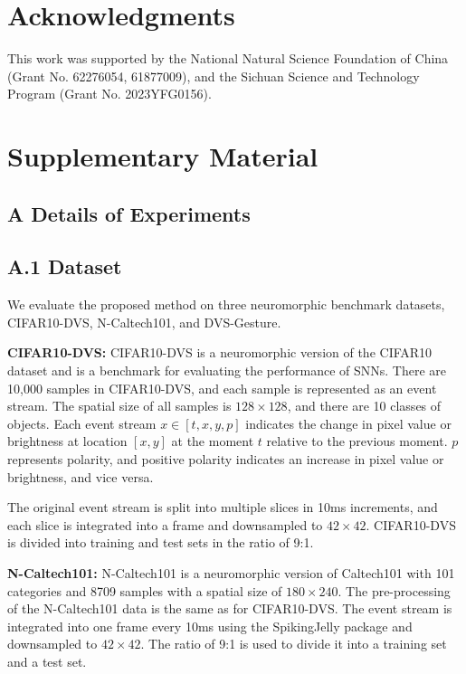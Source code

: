 \documentclass[letterpaper]{article} %
\begin{document}
\section{Acknowledgments}
This work was supported by the National Natural Science Foundation of China (Grant No. 62276054, 61877009), and the Sichuan Science and Technology Program (Grant No. 2023YFG0156).

\appendix
\section{Supplementary Material}
\label{Supplementary Material}
\subsection{A Details of Experiments}
\subsection{A.1 Dataset}
We evaluate the proposed method on three neuromorphic benchmark datasets, CIFAR10-DVS, N-Caltech101, and DVS-Gesture.

\textbf{CIFAR10-DVS:} CIFAR10-DVS \cite{CIFAR10-DVS} is a neuromorphic version of the CIFAR10 dataset and is a benchmark for evaluating the performance of SNNs. There are 10,000 samples in CIFAR10-DVS, and each sample is represented as an event stream. The spatial size of all samples is $128 \times 128$, and there are 10 classes of objects. Each event stream $x \in [t,x,y,p]$ indicates the change in pixel value or brightness at location $[x,y]$ at the moment $t$ relative to the previous moment. $p$ represents polarity, and positive polarity indicates an increase in pixel value or brightness, and vice versa.

 The original event stream is split into multiple slices in 10ms increments, and each slice is integrated into a frame and downsampled to $42 \times 42$. CIFAR10-DVS is divided into training and test sets in the ratio of 9:1.

\textbf{N-Caltech101:} N-Caltech101 \cite{N-Caltech101} is a neuromorphic version of Caltech101 with 101 categories and 8709 samples with a spatial size of $180 \times 240$. The pre-processing of the N-Caltech101 data is the same as for CIFAR10-DVS. The event stream is integrated into one frame every 10ms using the SpikingJelly package \cite{SpikingJelly} and downsampled to $42 \times 42$. The ratio of 9:1 is used to divide it into a training set and a test set.
\end{document}
